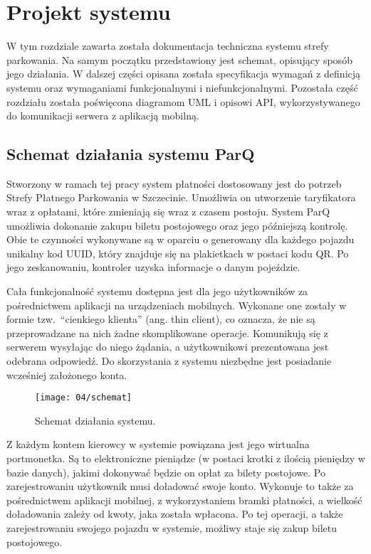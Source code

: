 \setcounter{listing}{0}

\section{Projekt systemu}
W tym rozdziale zawarta została dokumentacja techniczna systemu strefy parkowania. Na samym początku przedstawiony jest schemat, opisujący sposób jego działania. W dalszej części opisana została specyfikacja wymagań z definicją systemu oraz wymaganiami funkcjonalnymi i niefunkcjonalnymi. Pozostała część rozdziału została poświęcona diagramom UML i opisowi API, wykorzystywanego do komunikacji serwera z aplikacją mobilną. 

\subsection{Schemat działania systemu ParQ}

Stworzony w ramach tej pracy system płatności dostosowany jest do potrzeb Strefy Płatnego Parkowania w Szczecinie. Umożliwia on utworzenie taryfikatora wraz z opłatami, które zmieniają się wraz z czasem postoju. System ParQ umożliwia dokonanie zakupu biletu postojowego oraz jego późniejszą kontrolę. Obie te czynności wykonywane są w oparciu o generowany dla każdego pojazdu unikalny kod UUID, który znajduje się na plakietkach w postaci kodu QR. Po jego zeskanowaniu, kontroler uzyska informacje o danym pojeździe.

Cała funkcjonalność systemu dostępna jest dla jego użytkowników za pośrednictwem aplikacji na urządzeniach mobilnych. Wykonane one zostały w formie tzw.~``cienkiego klienta'' (ang. thin client), co oznacza, że nie są przeprowadzane na nich żadne skomplikowane operacje. Komunikują się z serwerem wysyłając do niego żądania, a użytkownikowi prezentowana jest odebrana odpowiedź. Do skorzystania z systemu niezbędne jest posiadanie wcześniej założonego konta.

\begin{figure}[h]
	\begin{center}
		\texttt{[image: 04/schemat]}
	\end{center}
	\caption{Schemat działania systemu.}
\end{figure}

Z każdym kontem kierowcy w systemie powiązana jest jego wirtualna portmonetka. Są to elektroniczne pieniądze (w postaci krotki z ilością pieniędzy w bazie danych), jakimi dokonywać będzie on opłat za bilety postojowe. Po zarejestrowaniu użytkownik musi doładować swoje konto. Wykonuje to także za pośrednictwem aplikacji mobilnej, z wykorzystaniem bramki płatności, a wielkość doładowania zależy od kwoty, jaka została wpłacona. Po tej operacji, a także zarejestrowaniu swojego pojazdu w systemie, możliwy staje się zakup biletu postojowego.

